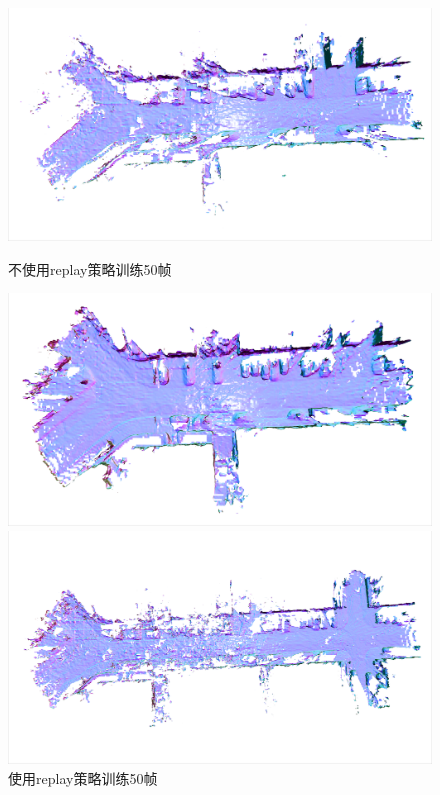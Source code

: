 \begin{figure}[p]
	\centering
	\begin{minipage}{0.5\linewidth}
		\centering
		\includegraphics[width=1\linewidth]{figures/50w.png}
        \caption*{不使用replay策略训练50帧}
	\end{minipage}\hfill
	\begin{minipage}{0.5\linewidth}
		\centering
		\includegraphics[width=1\linewidth]{figures/50o.png}
        \caption*{使用replay策略训练50帧}
	\end{minipage}
    \vfill
	\begin{minipage}{0.5\linewidth}
		\centering
		\includegraphics[width=1\linewidth]{figures/100w.png}

\end{minipage}
\end{figure}
